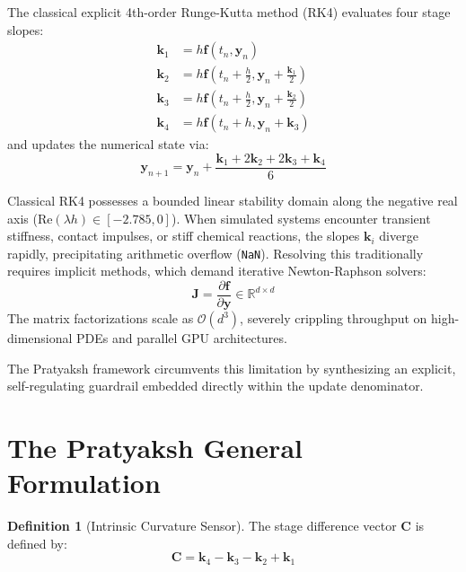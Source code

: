 \documentclass[11pt,a4paper]{article}
\theoremstyle{plain}
\theoremstyle{definition}
\newtheorem{definition}{Definition}
\begin{document}
The classical explicit 4th-order Runge-Kutta method (RK4) evaluates four stage slopes:
\begin{align}
\mathbf{k}_1 &= h \mathbf{f}(t_n, \mathbf{y}_n) \\
\mathbf{k}_2 &= h \mathbf{f}\left(t_n + \frac{h}{2}, \mathbf{y}_n + \frac{\mathbf{k}_1}{2}\right) \\
\mathbf{k}_3 &= h \mathbf{f}\left(t_n + \frac{h}{2}, \mathbf{y}_n + \frac{\mathbf{k}_2}{2}\right) \\
\mathbf{k}_4 &= h \mathbf{f}(t_n + h, \mathbf{y}_n + \mathbf{k}_3)
\end{align}
and updates the numerical state via:
\begin{equation}
\mathbf{y}_{n+1} = \mathbf{y}_n + \frac{\mathbf{k}_1 + 2\mathbf{k}_2 + 2\mathbf{k}_3 + \mathbf{k}_4}{6}
\end{equation}

Classical RK4 possesses a bounded linear stability domain along the negative real axis ($\text{Re}(\lambda h) \in [-2.785, 0]$). When simulated systems encounter transient stiffness, contact impulses, or stiff chemical reactions, the slopes $\mathbf{k}_i$ diverge rapidly, precipitating arithmetic overflow (\texttt{NaN}). Resolving this traditionally requires implicit methods, which demand iterative Newton-Raphson solvers:
\begin{equation}
\mathbf{J} = \frac{\partial \mathbf{f}}{\partial \mathbf{y}} \in \mathbb{R}^{d \times d}
\end{equation}
The matrix factorizations scale as $\mathcal{O}(d^3)$, severely crippling throughput on high-dimensional PDEs and parallel GPU architectures.

The Pratyaksh framework circumvents this limitation by synthesizing an explicit, self-regulating guardrail embedded directly within the update denominator.

\section{The Pratyaksh General Formulation}

\begin{definition}[Intrinsic Curvature Sensor]
The stage difference vector $\mathbf{C}$ is defined by:
\begin{equation}
\mathbf{C} = \mathbf{k}_4 - \mathbf{k}_3 - \mathbf{k}_2 + \mathbf{k}_1
\end{equation}
\end{definition}
\end{document}
